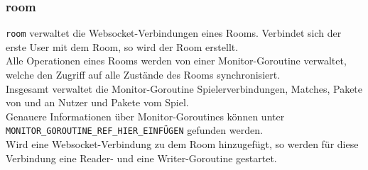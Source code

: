 \subsubsection{room}
\verb+room+ verwaltet die Websocket-Verbindungen eines Rooms. Verbindet sich der erste User mit dem Room, so wird der Room erstellt. \\
Alle Operationen eines Rooms werden von einer Monitor-Goroutine verwaltet, welche den Zugriff auf alle Zustände des Rooms synchronisiert. \\
Insgesamt verwaltet die Monitor-Goroutine Spielerverbindungen, Matches, Pakete von und an Nutzer und Pakete vom Spiel. \\
Genauere Informationen über Monitor-Goroutines können unter \verb+MONITOR_GOROUTINE_REF_HIER_EINFÜGEN+ gefunden werden. \\
Wird eine Websocket-Verbindung zu dem Room hinzugefügt, so werden für diese Verbindung eine Reader- und eine Writer-Goroutine gestartet. 

